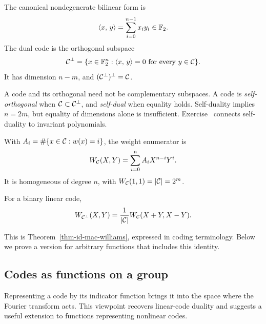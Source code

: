 \begin{defn}
\label{defn-code-dual}\label{notation-69}
The canonical nondegenerate bilinear form is
\begin{equation}
\label{eq-fbs-canonical-f2}
 \langle x,\,y\rangle=\sum_{i=0}^{n-1}x_i y_i\in\mathbb{F}_2.
\end{equation}
The dual code is the orthogonal subspace
\[
 \mathcal{C}^\bot=\{x\in\mathbb{F}_2^n:\langle x,\,y\rangle=0\text{ for every }y\in\mathcal{C}\}.
\]
It has dimension $n-m$, and $(\mathcal{C}^\bot)^\bot=\mathcal{C}$.
\end{defn}
A code and its orthogonal need not be complementary subspaces. A code
is \emph{self-orthogonal} when $\mathcal{C}\subset\mathcal{C}^\bot$, and \emph{self-dual}
when equality holds. Self-duality implies $n=2m$, but equality of dimensions
alone is insufficient. Exercise~ connects
self-duality to invariant polynomials.


\begin{defn}
\label{defn-polynomial-enumerator-code}
With $A_i=\#\{x\in\mathcal{C}:w(x)=i\}$, the weight enumerator is
\[
 W_{\mathcal{C}}(X,Y)=\sum_{i=0}^n A_iX^{n-i}Y^i.
\]
It is homogeneous of degree $n$, with $W_{\mathcal{C}}(1,1)=|\mathcal{C}|=2^m$.
\end{defn}


\begin{thm}
\label{thm-id-mac-williams-correctors-codes}
For a binary linear code,
\[
 W_{\mathcal{C}^\bot}(X,Y)=\frac1{|\mathcal{C}|}W_{\mathcal{C}}(X+Y,X-Y).
\]
\end{thm}
This is Theorem~\ref{thm-id-mac-williams}, expressed in coding terminology.
Below we prove a version for arbitrary functions that includes this identity.

\subsection{Codes as functions on a group}
\label{sect2-algebre-group-correctors-codes}

Representing a code by its indicator function brings it into the space where
the Fourier transform acts. This viewpoint recovers linear-code duality and
suggests a useful extension to functions representing nonlinear codes.

